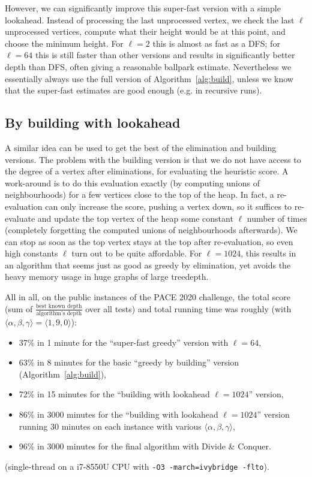 \documentclass{timgad}
\begin{document}
However, we can significantly improve this super-fast version with a simple lookahead.
Instead of processing the last unprocessed vertex, we check the last $\ell$ unprocessed vertices, compute what their height would be at this point, and choose the minimum height.
For $\ell=2$ this is almost as fast as a DFS;
for $\ell=64$ this is still faster than other versions and results in significantly better depth than DFS, often giving a reasonable ballpark estimate.
Nevertheless we essentially always use the full version of Algorithm~\ref{alg:build}, unless we know that the super-fast estimates are good enough (e.g. in recursive runs).

\subsection{By building with lookahead}
A similar idea can be used to get the best of the elimination and building versions.
The problem with the building version is that we do not have access to the degree of a vertex after eliminations, for evaluating the heuristic score.
A work-around is to do this evaluation exactly (by computing unions of neighbourhoods) for a few vertices close to the top of the heap.
In fact, a re-evaluation can only increase the score, pushing a vertex down,
so it suffices to re-evaluate and update the top vertex of the heap some constant $\ell$ number of times (completely forgetting the computed unions of neighbourhoods afterwards).
We can stop as soon as the top vertex stays at the top after re-evaluation, so even high constants $\ell$ turn out to be quite affordable.
For $\ell=1024$, this results in an algorithm that seems just as good as greedy by elimination, yet avoids the heavy memory usage in huge graphs of large treedepth.

All in all, on the public instances of the PACE 2020 challenge, the total score (sum of $\frac{\text{best known depth}}{\text{algorithm's depth}}$ over all tests) and total running time was roughly (with $\langle\alpha,\beta,\gamma\rangle=\langle 1,9,0\rangle$):
\begin{itemize}
\item 37\% in 1 minute for the ``super-fast greedy'' version with $\ell=64$,\\
\item 63\% in 8 minutes for the basic ``greedy by building'' version (Algorithm~\ref{alg:build}),\\
\item 72\% in 15 minutes for the ``building with lookahead $\ell=1024$'' version,\\
\item 86\% in 3000 minutes for the ``building with lookahead $\ell=1024$'' version running 30 minutes on each instance with various $\langle\alpha,\beta,\gamma\rangle$,\\
\item 96\% in 3000 minutes for the final algorithm with Divide \& Conquer.
\end{itemize}
(single-thread on a i7-8550U CPU with \texttt{-O3 -march=ivybridge -flto}).
\end{document}
